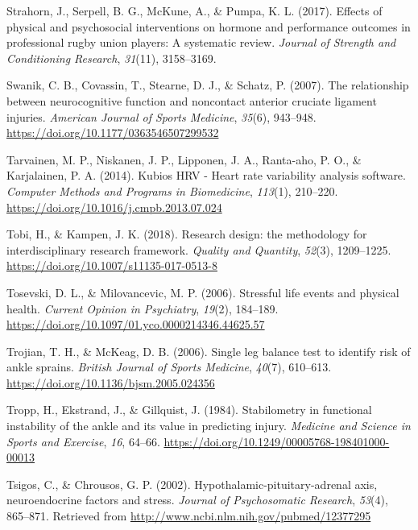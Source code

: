 \documentclass[
  english,
  man,floatsintext]{apa6}
\begin{document}
\leavevmode\hypertarget{ref-Strahorn2017}{}%
Strahorn, J., Serpell, B. G., McKune, A., \& Pumpa, K. L. (2017). Effects of physical and psychosocial interventions on hormone and performance outcomes in professional rugby union players: A systematic review. \emph{Journal of Strength and Conditioning Research}, \emph{31}(11), 3158--3169.

\leavevmode\hypertarget{ref-Swanik2007}{}%
Swanik, C. B., Covassin, T., Stearne, D. J., \& Schatz, P. (2007). The relationship between neurocognitive function and noncontact anterior cruciate ligament injuries. \emph{American Journal of Sports Medicine}, \emph{35}(6), 943--948. \url{https://doi.org/10.1177/0363546507299532}

\leavevmode\hypertarget{ref-Tarvainen2014}{}%
Tarvainen, M. P., Niskanen, J. P., Lipponen, J. A., Ranta-aho, P. O., \& Karjalainen, P. A. (2014). Kubios HRV - Heart rate variability analysis software. \emph{Computer Methods and Programs in Biomedicine}, \emph{113}(1), 210--220. \url{https://doi.org/10.1016/j.cmpb.2013.07.024}

\leavevmode\hypertarget{ref-Tobi2018a}{}%
Tobi, H., \& Kampen, J. K. (2018). Research design: the methodology for interdisciplinary research framework. \emph{Quality and Quantity}, \emph{52}(3), 1209--1225. \url{https://doi.org/10.1007/s11135-017-0513-8}

\leavevmode\hypertarget{ref-Tosevski2006}{}%
Tosevski, D. L., \& Milovancevic, M. P. (2006). Stressful life events and physical health. \emph{Current Opinion in Psychiatry}, \emph{19}(2), 184--189. \url{https://doi.org/10.1097/01.yco.0000214346.44625.57}

\leavevmode\hypertarget{ref-Trojian2006}{}%
Trojian, T. H., \& McKeag, D. B. (2006). Single leg balance test to identify risk of ankle sprains. \emph{British Journal of Sports Medicine}, \emph{40}(7), 610--613. \url{https://doi.org/10.1136/bjsm.2005.024356}

\leavevmode\hypertarget{ref-Tropp1984}{}%
Tropp, H., Ekstrand, J., \& Gillquist, J. (1984). Stabilometry in functional instability of the ankle and its value in predicting injury. \emph{Medicine and Science in Sports and Exercise}, \emph{16}, 64--66. \url{https://doi.org/10.1249/00005768-198401000-00013}

\leavevmode\hypertarget{ref-Tsigos2002}{}%
Tsigos, C., \& Chrousos, G. P. (2002). Hypothalamic-pituitary-adrenal axis, neuroendocrine factors and stress. \emph{Journal of Psychosomatic Research}, \emph{53}(4), 865--871. Retrieved from \url{http://www.ncbi.nlm.nih.gov/pubmed/12377295}
\end{document}
